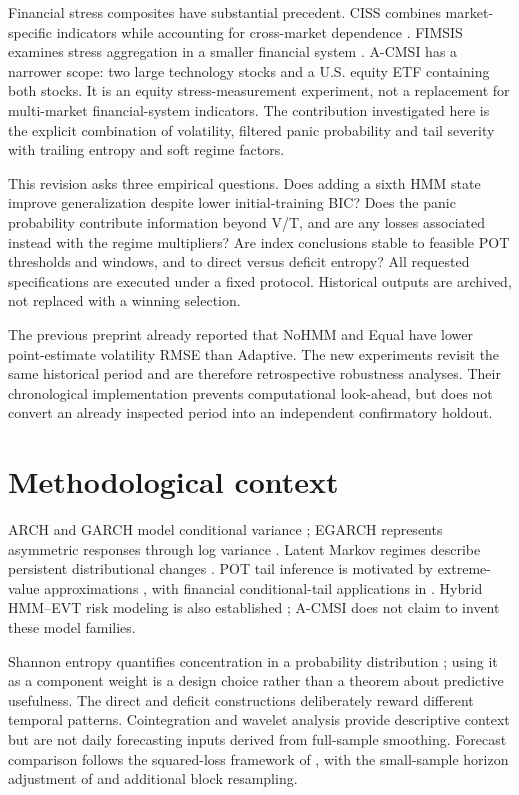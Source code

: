 \documentclass[11pt]{article}
\begin{document}
Financial stress composites have substantial precedent. CISS combines market-specific indicators while
accounting for cross-market dependence \citep{ciss}. FIMSIS examines stress aggregation in a smaller
financial system \citep{fimsis}. A-CMSI has a narrower scope: two large technology stocks and a U.S.
equity ETF containing both stocks. It is an equity stress-measurement experiment, not a replacement for
multi-market financial-system indicators. The contribution investigated here is the explicit combination
of volatility, filtered panic probability and tail severity with trailing entropy and soft regime factors.

This revision asks three empirical questions. Does adding a sixth HMM state improve generalization
despite lower initial-training BIC? Does the panic probability contribute information beyond V/T, and
are any losses associated instead with the regime multipliers? Are index conclusions stable to feasible
POT thresholds and windows, and to direct versus deficit entropy? All requested specifications are
executed under a fixed protocol. Historical outputs are archived, not replaced with a winning selection.

The previous preprint already reported that NoHMM and Equal have lower point-estimate volatility RMSE
than Adaptive. The new experiments revisit the same historical period and are therefore retrospective
robustness analyses. Their chronological implementation prevents computational look-ahead, but does not
convert an already inspected period into an independent confirmatory holdout.

\section{Methodological context}
ARCH and GARCH model conditional variance \citep{engle,bollerslev}; EGARCH represents asymmetric
responses through log variance \citep{nelson}. Latent Markov regimes describe persistent distributional
changes \citep{hamilton}. POT tail inference is motivated by extreme-value approximations
\citep{pickands}, with financial conditional-tail applications in \citet{mcneil}. Hybrid HMM--EVT
risk modeling is also established \citep{salhi}; A-CMSI does not claim to invent these model families.

Shannon entropy quantifies concentration in a probability distribution \citep{shannon}; using it as a
component weight is a design choice rather than a theorem about predictive usefulness. The direct and
deficit constructions deliberately reward different temporal patterns. Cointegration \citep{johansen}
and wavelet analysis \citep{torrence} provide descriptive context but are not daily forecasting inputs
derived from full-sample smoothing. Forecast comparison follows the squared-loss framework of
\citet{dm}, with the small-sample horizon adjustment of \citet{hln} and additional block resampling.
\end{document}
